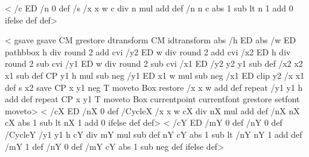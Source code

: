 
\ifx\PstTiling\@undefined
<%
  /c ED
  /n 0 def
  /s {
    /x x w c div n mul add def
    /n n c abs 1 sub lt { n 1 add } { 0 } ifelse def
  } def>

<%
  gsave
    gsave \tx@STV CM grestore dtransform CM idtransform
    abs /h ED abs /w ED
    pathbbox
    h div round 2 add cvi /y2 ED
    w div round 2 add cvi /x2 ED
    h div round 2 sub cvi /y1 ED
    w div round 2 sub cvi /x1 ED
    /y2 y2 y1 sub def
    /x2 x2 x1 sub def
    CP
    y1 h mul sub neg /y1 ED
    x1 w mul sub neg /x1 ED
    clip
    y2 {
      /x x1 def
      s
      x2 {
        save CP x y1 
        \ifx\VTeXversion\undefined
        \else
        neg
        \fi
	T moveto Box restore
        /x x w add def
      } repeat
      /y1 y1 h add def
    } repeat
    CP x y1 T moveto Box
  currentpoint currentfont grestore setfont moveto>
\else
<%
  /cX ED
  /nX 0 def
  /CycleX {
    /x x w cX div nX mul add def
    /nX nX cX abs 1 sub lt { nX 1 add } { 0 } ifelse def
  } def>
<%
  /cY ED
  /mY 0 def
  /nY 0 def
  /CycleY {
    /y1 y1 h cY div mY mul sub def
    nY cY abs 1 sub lt { /nY nY 1 add def /mY 1 def }
                       { /nY 0 def        /mY cY abs 1 sub neg def } ifelse
  } def>

